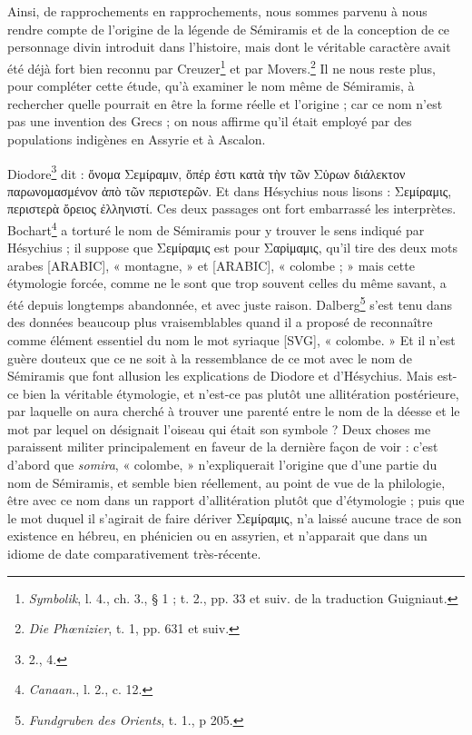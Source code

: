 \documentclass[a4paper, 11pt, oneside]{article}
\begin{document}
\bigskip \centerline{\EightStarTaper} \centerline{\EightStarTaper\EightStarTaper} \bigskip\clearpage
\section{}
\paragraph{}
Ainsi, de rapprochements en rapprochements, nous sommes parvenu à nous rendre compte de l'origine de la légende de Sémiramis et de la conception de ce personnage divin introduit dans l'histoire, mais dont le véritable caractère avait été déjà fort bien reconnu par Creuzer\footnote{\emph{Symbolik}, l. 4., ch. 3., § 1 ; t. 2., pp. 33 et suiv. de la traduction Guigniaut.} et par Movers.\footnote{\emph{Die Phœnizier}, t. 1, pp. 631 et suiv.} Il ne nous reste plus, pour compléter cette étude, qu'à examiner le nom même de Sémiramis, à rechercher quelle pourrait en être la forme réelle et l'origine ; car ce nom n'est pas une invention des Grecs ; on nous affirme qu'il était employé par des populations indigènes en Assyrie et à Ascalon.

Diodore\footnote{2., 4.} dit : ὄνομα Σεμίραμιν, ὅπέρ ἐστι κατὰ τὴν τῶν Σὑρων διάλεκτον παρωνομασμένον ἀπὸ τῶν περιστερῶν. Et dans Hésychius nous lisons : Σεμίραμις, περιστερὰ ὄρειος ἐλληνιστί. Ces deux passages ont fort embarrassé les interprètes. Bochart\footnote{\emph{Canaan.}, l. 2., c. 12.} a torturé le nom de Sémiramis pour y trouver le sens indiqué par Hésychius ; il suppose que Σεμίραμις est pour Σαρἱμαμις, qu'il tire des deux mots arabes [ARABIC], « montagne, » et [ARABIC], « colombe ; » mais cette étymologie forcée, comme ne le sont que trop souvent celles du même savant, a été depuis longtemps abandonnée, et avec juste raison. Dalberg\footnote{\emph{Fundgruben des Orients}, t. 1., p 205.} s'est tenu dans des données beaucoup plus vraisemblables quand il a proposé de reconnaître comme élément essentiel du nom le mot syriaque [SVG], « colombe. » Et il n'est guère douteux que ce ne soit à la ressemblance de ce mot avec le nom de Sémiramis que font allusion les explications de Diodore et d'Hésychius. Mais est-ce bien la véritable étymologie, et n'est-ce pas plutôt une allitération postérieure, par laquelle on aura cherché à trouver une parenté entre le nom de la déesse et le mot par lequel on désignait l'oiseau qui était son symbole ? Deux choses me paraissent militer principalement en faveur de la dernière façon de voir : c'est d'abord que \emph{somira}, « colombe, » n'expliquerait l'origine que d'une partie du nom de Sémiramis, et semble bien réellement, au point de vue de la philologie, être avec ce nom dans un rapport d'allitération plutôt que d'étymologie ; puis que le mot duquel il s'agirait de faire dériver Σεμίραμις, n'a laissé aucune trace de son existence en hébreu, en phénicien ou en assyrien, et n'apparait que dans un idiome de date comparativement très-récente.
\end{document}
